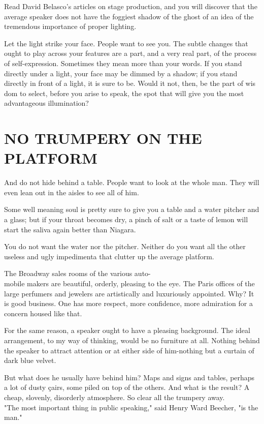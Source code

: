 \documentclass[10pt]{article}
\begin{document}
Read David Belasco's articles on stage production, and you will discover that the average speaker does not have the foggiest shadow of the ghost of an idea of the tremendous importance of proper lighting.

Let the light strike your face. People want to see you. The subtle changes that ought to play across your features are a part, and a very real part, of the process of self-expression. Sometimes they mean more than your words. If you stand directly under a light, your face may be dimmed by a shadow; if you stand directly in front of a light, it is sure to be. Would it not, then, be the part of wis dom to select, before you arise to speak, the spot that will give you the most advantageous illumination?

\section*{NO TRUMPERY ON THE PLATFORM}
And do not hide behind a table. People want to look at the whole man. They will even lean out in the aisles to see all of him.

Some well meaning soul is pretty sure to give you a table and a water pitcher and a glass; but if your throat becomes dry, a pinch of salt or a taste of lemon will start the saliva again better than Niagara.

You do not want the water nor the pitcher. Neither do you want all the other useless and ugly impedimenta that clutter up the average platform.

The Broadway sales rooms of the various auto-\\
mobile makers are beautiful, orderly, pleasing to the eye. The Paris offices of the large perfumers and jewelers are artistically and luxuriously appointed. Why? It is good business. One has more respect, more confidence, more admiration for a concern housed like that.

For the same reason, a speaker ought to have a pleasing background. The ideal arrangement, to my way of thinking, would be no furniture at all. Nothing behind the speaker to attract attention or at either side of him-nothing but a curtain of dark blue velvet.

But what does he usually have behind him? Maps and signs and tables, perhaps a lot of dusty çairs, some piled on top of the others. And what is the result? A cheap, slovenly, disorderly atmosphere. So clear all the trumpery away.\\
"The most important thing in public speaking," said Henry Ward Beecher, "is the man."
\end{document}
